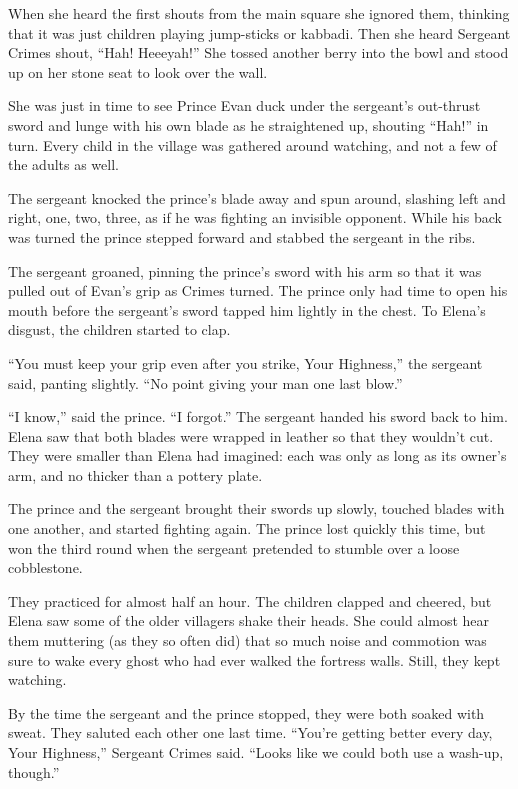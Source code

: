 \documentclass[10pt]{book}
\begin{document}
When she heard the first shouts from the main square she ignored them, thinking that it was just children playing jump-sticks or kabbadi. Then she heard Sergeant Crimes shout, ``Hah! Heeeyah!'' She tossed another berry into the bowl and stood up on her stone seat to look over the wall.

She was just in time to see Prince Evan duck under the sergeant's out-thrust sword and lunge with his own blade as he straightened up, shouting ``Hah!'' in turn. Every child in the village was gathered around watching, and not a few of the adults as well.

The sergeant knocked the prince's blade away and spun around, slashing left and right, one, two, three, as if he was fighting an invisible opponent. While his back was turned the prince stepped forward and stabbed the sergeant in the ribs.

The sergeant groaned, pinning the prince's sword with his arm so that it was pulled out of Evan's grip as Crimes turned. The prince only had time to open his mouth before the sergeant's sword tapped him lightly in the chest. To Elena's disgust, the children started to clap.

``You must keep your grip even after you strike, Your Highness,'' the sergeant said, panting slightly. ``No point giving your man one last blow.''

``I know,'' said the prince. ``I forgot.'' The sergeant handed his sword back to him. Elena saw that both blades were wrapped in leather so that they wouldn't cut. They were smaller than Elena had imagined: each was only as long as its owner's arm, and no thicker than a pottery plate.

The prince and the sergeant brought their swords up slowly, touched blades with one another, and started fighting again. The prince lost quickly this time, but won the third round when the sergeant pretended to stumble over a loose cobblestone.

They practiced for almost half an hour. The children clapped and cheered, but Elena saw some of the older villagers shake their heads. She could almost hear them muttering (as they so often did) that so much noise and commotion was sure to wake every ghost who had ever walked the fortress walls. Still, they kept watching.

By the time the sergeant and the prince stopped, they were both soaked with sweat. They saluted each other one last time. ``You're getting better every day, Your Highness,'' Sergeant Crimes said. ``Looks like we could both use a wash-up, though.''
\end{document}
